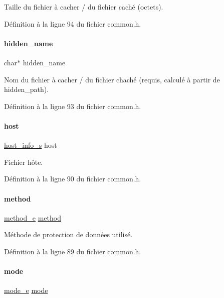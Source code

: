 Taille du fichier à cacher / du fichier caché (octets). 

Définition à la ligne 94 du fichier common.\+h.

\mbox{\label{a00154_afa18e57ba4ce959f5ecd8502fd19f858}} 
\paragraph{\texorpdfstring{hidden\+\_\+name}{hidden\_name}}
{\footnotesize\ttfamily char$\ast$ hidden\+\_\+name}

Nom du fichier à cacher / du fichier chaché (requis, calculé à partir de hidden\+\_\+path). 

Définition à la ligne 93 du fichier common.\+h.

\mbox{\label{a00154_ae7100c66dee555f78d82f3bab2ad5ee7}} 
\paragraph{\texorpdfstring{host}{host}}
{\footnotesize\ttfamily \hyperlink{a00047_a47a6ba857e6823e361bd050dfdf415a2}{host\+\_\+info\+\_\+s} host}

Fichier hôte. 

Définition à la ligne 90 du fichier common.\+h.

\mbox{\label{a00154_afe7c54ffc777d8584a1fc4f9e78790d0}} 
\paragraph{\texorpdfstring{method}{method}}
{\footnotesize\ttfamily \hyperlink{a00008_ad7acd42acef1f832c261f34b380de326}{method\+\_\+e} \hyperlink{a00008_abed946c62f140eb7ff2ac742e6ad9497}{method}}

Méthode de protection de données utilisé. 

Définition à la ligne 89 du fichier common.\+h.

\mbox{\label{a00154_a53c249857abc01a599a933ee5c4e1841}} 
\paragraph{\texorpdfstring{mode}{mode}}
{\footnotesize\ttfamily \hyperlink{a00008_a3410d2f61b2ebef290660e7d14215bbd}{mode\+\_\+e} \hyperlink{a00008_a1a6b6fb557d8d37d59700faf4e4c9167}{mode}}

